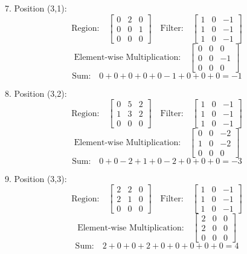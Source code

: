 \documentclass{article}
\begin{document}
7. Position (3,1):
\[
  \text{Region:} \quad \begin{bmatrix} 0 & 2 & 0 \\ 0 & 0 & 1 \\ 0 & 0 & 0 \end{bmatrix} \quad \text{Filter:} \quad \begin{bmatrix} 1 & 0 & -1 \\ 1 & 0 & -1 \\ 1 & 0 & -1 \end{bmatrix}
\]
\[
  \text{Element-wise Multiplication:} \quad \begin{bmatrix} 0 & 0 & 0 \\ 0 & 0 & -1 \\ 0 & 0 & 0 \end{bmatrix}
\]
\[
  \text{Sum:} \quad 0 + 0 + 0 + 0 + 0 - 1 + 0 + 0 + 0 = -1
\]

8. Position (3,2):
\[
  \text{Region:} \quad \begin{bmatrix} 0 & 5 & 2 \\ 1 & 3 & 2 \\ 0 & 0 & 0 \end{bmatrix} \quad \text{Filter:} \quad \begin{bmatrix} 1 & 0 & -1 \\ 1 & 0 & -1 \\ 1 & 0 & -1 \end{bmatrix}
\]
\[
  \text{Element-wise Multiplication:} \quad \begin{bmatrix} 0 & 0 & -2 \\ 1 & 0 & -2 \\ 0 & 0 & 0 \end{bmatrix}
\]
\[
  \text{Sum:} \quad 0 + 0 - 2 + 1 + 0 - 2 + 0 + 0 + 0 = -3
\]

9. Position (3,3):
\[
  \text{Region:} \quad \begin{bmatrix} 2 & 2 & 0 \\ 2 & 1 & 0 \\ 0 & 0 & 0 \end{bmatrix} \quad \text{Filter:} \quad \begin{bmatrix} 1 & 0 & -1 \\ 1 & 0 & -1 \\ 1 & 0 & -1 \end{bmatrix}
\]
\[
  \text{Element-wise Multiplication:} \quad \begin{bmatrix} 2 & 0 & 0 \\ 2 & 0 & 0 \\ 0 & 0 & 0 \end{bmatrix}
\]
\[
  \text{Sum:} \quad 2 + 0 + 0 + 2 + 0 + 0 + 0 + 0 + 0 = 4
\]
\end{document}
